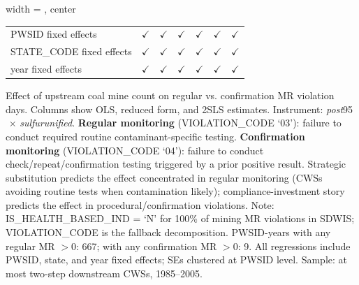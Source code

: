 \begin{table}[htbp]
\begin{adjustbox}{width = \textwidth, center}
\begin{tabular}{lcccccc}
          \\
         
         PWSID fixed effects                         & $\checkmark$  & $\checkmark$  & $\checkmark$  & $\checkmark$  & $\checkmark$  & $\checkmark$\\   
         STATE\_CODE fixed effects                   & $\checkmark$  & $\checkmark$  & $\checkmark$  & $\checkmark$  & $\checkmark$  & $\checkmark$\\   
         year fixed effects                          & $\checkmark$  & $\checkmark$  & $\checkmark$  & $\checkmark$  & $\checkmark$  & $\checkmark$\\   
         
         \bottomrule
         
      \end{tabular}
      
      
      
   \end{adjustbox}
      {\tiny\linespread{1}\selectfont \par \raggedright 
   Effect of upstream coal mine count on regular vs. confirmation MR violation days. Columns show OLS, reduced form, and 2SLS estimates. Instrument: \textit{post}95$\,\times\,$\textit{sulfur\textunderscore unified}. \textbf{Regular monitoring} (VIOLATION\_CODE `03'): failure to conduct required routine contaminant-specific testing. \textbf{Confirmation monitoring} (VIOLATION\_CODE `04'): failure to conduct check/repeat/confirmation testing triggered by a prior positive result. Strategic substitution predicts the effect concentrated in regular monitoring (CWSs avoiding routine tests when contamination likely); compliance-investment story predicts the effect in procedural/confirmation violations. Note: IS\_HEALTH\_BASED\_IND = `N' for 100\% of mining MR violations in SDWIS; VIOLATION\_CODE is the fallback decomposition. PWSID-years with any regular MR $> 0$: 667; with any confirmation MR $> 0$: 9. All regressions include PWSID, state, and year fixed effects; SEs clustered at PWSID level. Sample: at most two-step downstream CWSs, 1985--2005.}
   
\end{table}


